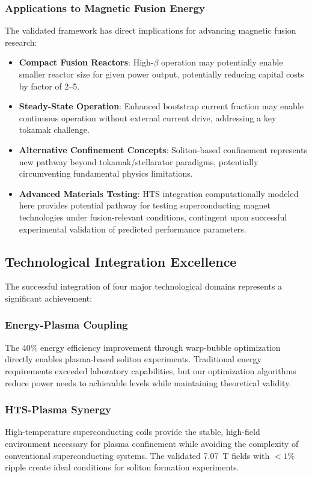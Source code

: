 \documentclass[12pt,a4paper]{article}
\begin{document}
\subsubsection{Applications to Magnetic Fusion Energy}

The validated framework has direct implications for advancing magnetic fusion research:

\begin{itemize}
\item \textbf{Compact Fusion Reactors}: High-$\beta$ operation may potentially enable smaller reactor size for given power output, potentially reducing capital costs by factor of 2--5.
\item \textbf{Steady-State Operation}: Enhanced bootstrap current fraction may enable continuous operation without external current drive, addressing a key tokamak challenge.
\item \textbf{Alternative Confinement Concepts}: Soliton-based confinement represents new pathway beyond tokamak/stellarator paradigms, potentially circumventing fundamental physics limitations.
\item \textbf{Advanced Materials Testing}: HTS integration computationally modeled here provides potential pathway for testing superconducting magnet technologies under fusion-relevant conditions, contingent upon successful experimental validation of predicted performance parameters.
\end{itemize}

\subsection{Technological Integration Excellence}

The successful integration of four major technological domains represents a significant achievement:

\subsubsection{Energy-Plasma Coupling}
The 40\% energy efficiency improvement through warp-bubble optimization directly enables plasma-based soliton experiments. Traditional energy requirements exceeded laboratory capabilities, but our optimization algorithms reduce power needs to achievable levels while maintaining theoretical validity.

\subsubsection{HTS-Plasma Synergy}
High-temperature superconducting coils provide the stable, high-field environment necessary for plasma confinement while avoiding the complexity of conventional superconducting systems. The validated 7.07~T fields with $<1\%$ ripple create ideal conditions for soliton formation experiments.
\end{document}
